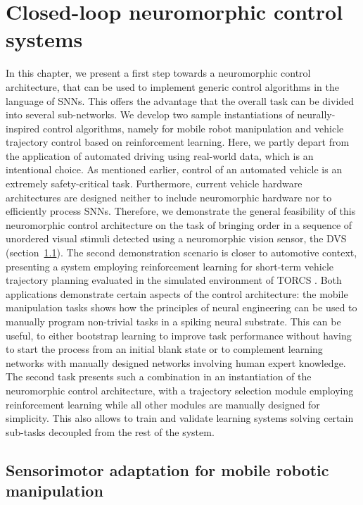 \chapter{Closed-loop neuromorphic control systems}%
\label{chap:closed_loop_neuromorphic_control_systems}

In this chapter, we present a first step towards a neuromorphic control architecture, that can be used to implement generic control algorithms in the language of \acfp{SNN}.
This offers the advantage that the overall task can be divided into several sub-networks.
We develop two sample instantiations of neurally-inspired control algorithms, namely for mobile robot manipulation and vehicle trajectory control based on reinforcement learning.
Here, we partly depart from the application of automated driving using real-world data, which is an intentional choice.
As mentioned earlier, control of an automated vehicle is an extremely safety-critical task.
Furthermore, current vehicle hardware architectures are designed neither to include neuromorphic hardware nor to efficiently process \acp{SNN}.
Therefore, we demonstrate the general feasibility of this neuromorphic control architecture on the task of bringing order in a sequence of unordered visual stimuli detected using a neuromorphic vision sensor, the \ac{DVS} (section~\ref{sec:sensorimotor_adaptation_for_mobile_robotic_manipulation}). 
The second demonstration scenario is closer to automotive context, presenting a system employing reinforcement learning for short-term vehicle trajectory planning evaluated in the simulated environment of \acf{TORCS} \parencite{TORCS}.
Both applications demonstrate certain aspects of the control architecture: the mobile manipulation tasks shows how the principles of neural engineering can be used to manually program non-trivial tasks in a spiking neural substrate.
This can be useful, to either bootstrap learning to improve task performance without having to start the process from an initial blank state or to complement learning networks with manually designed networks involving human expert knowledge.
The second task presents such a combination in an instantiation of the neuromorphic control architecture, with a trajectory selection module employing reinforcement learning while all other modules are manually designed for simplicity.
This also allows to train and validate learning systems solving certain sub-tasks decoupled from the rest of the system.


\section{Sensorimotor adaptation for mobile robotic manipulation}%
\label{sec:sensorimotor_adaptation_for_mobile_robotic_manipulation}

